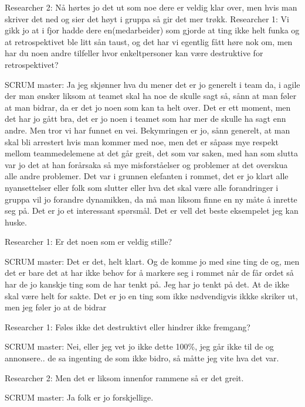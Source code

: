 Researcher 2: Nå hørtes jo det ut som noe dere er veldig klar over, men hvis man skriver det ned og sier det høyt i gruppa så gir det mer trøkk.
Researcher 1: Vi gikk jo at i fjor hadde dere en(medarbeider) som gjorde at ting ikke helt funka og at retrospektivet ble litt sån taust, og det har vi egentlig fått høre nok om, men har du noen andre tilfeller hvor enkeltpersoner kan være destruktive for retrospektivet?

SCRUM master: Ja jeg skjønner hva du mener det er jo generelt i team da, i agile der man ønsker liksom at teamet skal ha noe de skulle sagt så, sånn at man føler at man bidrar, da er det jo noen som kan ta helt over. Det er ett moment, men det har jo gått bra, det er jo noen i teamet som har mer de skulle ha sagt enn andre. Men tror vi har funnet en vei. Bekymringen er jo, sånn generelt, at man skal bli arrestert hvis man kommer med noe, men det er såpass mye respekt mellom teammedelemene at det går greit, det som var saken, med han som slutta var jo det at han forårsaka så mye misforståelser og problemer at det overskua alle andre problemer. Det var i grunnen elefanten i rommet, det er jo klart alle nyansettelser eller folk som slutter eller hva det skal være alle forandringer i gruppa vil jo forandre dynamikken, da må man liksom finne en ny måte å inrette seg på. Det er jo et interessant spørsmål. Det er vell det beste eksempelet jeg kan huske.

Researcher 1: Er det noen som er veldig stille?

SCRUM master: Det er det, helt klart. Og de komme jo med sine ting de og, men det er bare det at har ikke behov for å markere seg i rommet når de får ordet så har de jo kanskje ting som de har tenkt på. Jeg har jo tenkt på det. At de ikke skal være helt for sakte. Det er jo en ting som ikke nødvendigvis ikkke skriker ut, men jeg føler jo at de bidrar

Researcher 1: Føles ikke det destruktivt eller hindrer ikke fremgang?

SCRUM master: Nei, eller jeg vet jo ikke dette 100\%, jeg går ikke til de og annonsere.. de sa ingenting de som ikke bidro, så måtte jeg vite hva det var.

Researcher 2: Men det er liksom innenfor rammene så er det greit.

SCRUM master: Ja folk er jo forskjellige.

